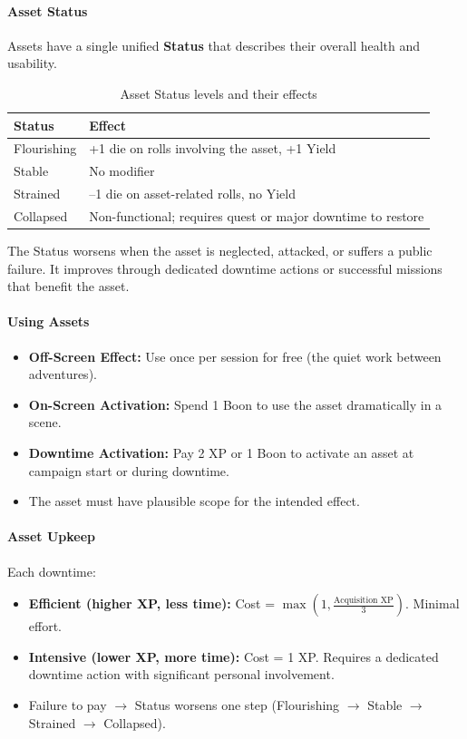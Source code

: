 \paragraph{Asset Status}
Assets have a single unified \textbf{Status} that describes their overall health and usability.

\begin{table}[htbp]
\centering
\small
\begin{tabularx}{\linewidth}{lX}
\toprule
\textbf{Status} & \textbf{Effect} \\
\midrule
Flourishing & +1 die on rolls involving the asset, +1 Yield \\
Stable & No modifier \\
Strained & --1 die on asset-related rolls, no Yield \\
Collapsed & Non-functional; requires quest or major downtime to restore \\
\bottomrule
\end{tabularx}
\caption{Asset Status levels and their effects}
\label{tab:asset-status}
\end{table}

The Status worsens when the asset is neglected, attacked, or suffers a public failure. It improves through dedicated downtime actions or successful missions that benefit the asset.

\paragraph{Using Assets}
\begin{itemize}
  \item \textbf{Off-Screen Effect:} Use once per session for free (the quiet work between adventures).
  \item \textbf{On-Screen Activation:} Spend 1 Boon to use the asset dramatically in a scene.
  \item \textbf{Downtime Activation:} Pay 2 XP or 1 Boon to activate an asset at campaign start or during downtime.
  \item The asset must have plausible scope for the intended effect.
\end{itemize}

\paragraph{Asset Upkeep}
Each downtime:
\begin{itemize}
  \item \textbf{Efficient (higher XP, less time):} Cost = \(\max(1, \frac{\text{Acquisition XP}}{3})\). Minimal effort.
  \item \textbf{Intensive (lower XP, more time):} Cost = 1 XP. Requires a dedicated downtime action with significant personal involvement.
  \item Failure to pay $\rightarrow$ Status worsens one step (Flourishing $\rightarrow$ Stable $\rightarrow$ Strained $\rightarrow$ Collapsed).
\end{itemize}

